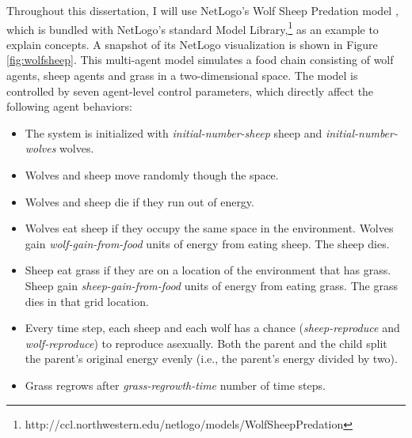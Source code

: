 Throughout this dissertation, I will use NetLogo's Wolf Sheep Predation model \cite{wolfsheep}, which is bundled with NetLogo's standard Model Library,\footnote{http://ccl.northwestern.edu/netlogo/models/WolfSheepPredation} as an example to explain concepts.
A snapshot of its NetLogo visualization is shown in Figure \ref{fig:wolfsheep}.
This multi-agent model simulates a food chain consisting of wolf agents, sheep agents and grass in a two-dimensional space.
The model is controlled by seven agent-level control parameters, which directly affect the following agent behaviors:
\begin{itemize}
  \item The system is initialized with \textit{initial-number-sheep} sheep and \textit{initial-number-wolves} wolves.
  \item Wolves and sheep move randomly though the space.
  \item Wolves and sheep die if they run out of energy.
  \item Wolves eat sheep if they occupy the same space in the environment. Wolves gain \textit{wolf-gain-from-food} units of energy from eating sheep. The sheep dies.
  \item Sheep eat grass if they are on a location of the environment that has grass. Sheep gain \textit{sheep-gain-from-food} units of energy from eating grass. The grass dies in that grid location.
  \item Every time step, each sheep and each wolf has a chance (\textit{sheep-reproduce} and \textit{wolf-reproduce}) to reproduce asexually. Both the parent and the child split the parent's original energy evenly (i.e., the parent's energy divided by two).
  \item Grass regrows after \textit{grass-regrowth-time} number of time steps.
\end{itemize}

